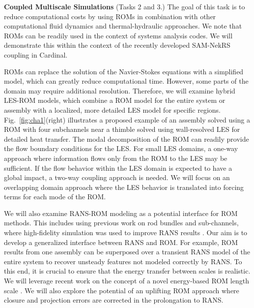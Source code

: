 
\vspace{.08in}
\noindent \textbf{Coupled Multiscale Simulations} (Tasks 2 and 3.)
The goal of this task is to reduce computational costs by using ROMs in 
combination with other computational fluid dynamics and thermal-hydraulic
approaches. We note that ROMs can be readily used in the context of systems
analysis codes. We will demonstrate this within the context of the recently
developed SAM-NekRS coupling in Cardinal.

ROMs can replace the solution of the Navier-Stokes equations with a simplified
model, which can greatly reduce computational time. However, some parts of the
domain may require additional resolution. Therefore, we will examine hybrid
LES-ROM models, which combine a ROM model for the entire system or assembly
with a localized, more detailed LES model for specific regions.
Fig.~\ref{fig:cha1}(right) illustrates a proposed example of an assembly solved
using a ROM with four subchannels near a thimble solved using wall-resolved LES
for detailed heat transfer.  The modal decomposition of the ROM can readily
provide the flow boundary conditions for the LES.  For small LES domains, a
one-way approach where information flows only from the ROM to the LES may be
sufficient. If the flow behavior within the LES domain is expected to have a
global impact, a two-way coupling approach is needed. We will focus on an
overlapping domain approach where the LES behavior is translated into forcing
terms for each mode of the ROM.

We will also examine RANS-ROM modeling as a potential interface for ROM
methods. This includes using previous work on rod bundles and sub-channels,
where high-fidelity simulation was used to improve RANS results
\cite{martinez2019a}.
Our aim is to develop a generalized interface between RANS and ROM. For
example, ROM results from one assembly can be superposed over a transient RANS
model of the entire system to recover unsteady features not modeled correctly
by RANS. To this end, it is crucial to ensure that the energy transfer between
scales is realistic. We will leverage recent work on the concept of a novel
energy-based ROM length scale \cite{mou2021}. We will also explore the
potential of an uplifting ROM approach \cite{ahmed2020} where closure and
projection errors are corrected in the prolongation to RANS.
\\[-2ex]


